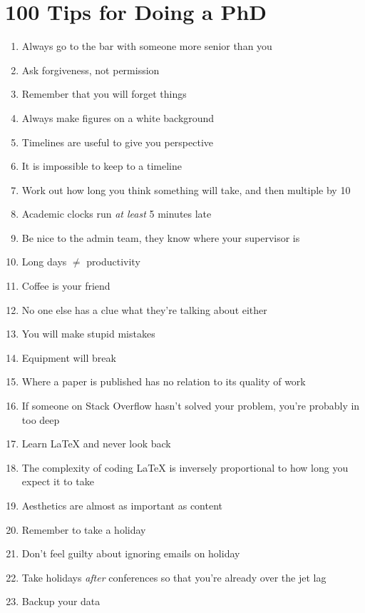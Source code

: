 %
%

\chapter{100 Tips for Doing a PhD}
\label{app:app01}

\begin{enumerate}
	\item Always go to the bar with someone more senior than you
	\item Ask forgiveness, not permission
	\item Remember that you will forget things
	\item Always make figures on a white background
	\item Timelines are useful to give you perspective
	\item It is impossible to keep to a timeline
	\item Work out how long you think something will take, and then multiple by 10 \cite{Hofstadter}
	\item Academic clocks run \emph{at least} 5 minutes late
	\item Be nice to the admin team, they know where your supervisor is
	\item Long days $\ne$ productivity
	\item Coffee is your friend
	\item No one else has a clue what they're talking about either
	\item You will make stupid mistakes
	\item Equipment will break
	\item Where a paper is published has no relation to its quality of work 
	\item If someone on Stack Overflow hasn't solved your problem, you're probably in too deep
	\item Learn \LaTeX{} and never look back
	\item The complexity of coding \LaTeX{} is inversely proportional to how long you expect it to take
	\item Aesthetics are almost as important as content
	\item Remember to take a holiday
	\item Don't feel guilty about ignoring emails on holiday
	\item Take holidays \emph{after} conferences so that you're already over the jet lag
	\item Backup your data

\end{enumerate}
